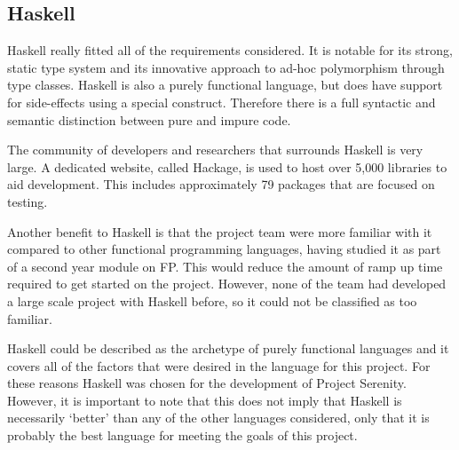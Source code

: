 \subsection{Haskell}


Haskell really fitted all of the requirements considered. It is notable for its strong, static type system and its innovative approach to ad-hoc polymorphism through type classes.\cite{wadler1989typeclasses} Haskell is also a purely functional language, but does have support for side-effects using a special construct. Therefore there is a full syntactic and semantic distinction between pure and impure code.

The community of developers and researchers that surrounds Haskell is very large. A dedicated website, called Hackage, is used to host over 5,000 libraries to aid development. This includes approximately 79 packages that are focused on testing.

Another benefit to Haskell is that the project team were more familiar with it compared to other functional programming languages, having studied it as part of a second year module on FP. This would reduce the amount of ramp up time required to get started on the project. However, none of the team had developed a large scale project with Haskell before, so it could not be classified as too familiar.

Haskell could be described as the archetype of purely functional languages and it covers all of the factors that were desired in the language for this project. For these reasons Haskell was chosen for the development of Project Serenity. However, it is important to note that this does not imply that Haskell is necessarily `better' than any of the other languages considered, only that it is probably the best language for meeting the goals of this project.
